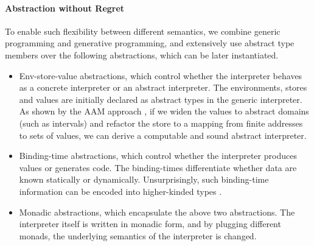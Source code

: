\iffalse
embedded domain-specific languages \cite{DBLP:conf/snapl/RompfBLSJAOSKDK15,
DBLP:journals/jfp/CaretteKS09, DBLP:conf/icfp/GibbonsW14,
Hofer:2008:PED:1449913.1449935},
The key idea that enables this flexibility is to use abstract type members first
abstract over concrete/abstract components (e.g., concrete values or abstract
values), then as well as the binding-time of them (e.g., static or dynamic). By
staging, the overhead caused by the monadic layers is eliminated in the
generated code.
\fi

\paragraph{Abstraction without Regret}

To enable such flexibility between different semantics, we combine generic
programming and generative programming, and extensively use abstract type
members over the following abstractions, which can be later instantiated.

\begin{itemize}
\item Env-store-value abstractions, which control whether the interpreter
  behaves as a concrete interpreter or an abstract interpreter.
  The environments, stores and values are initially declared as abstract types in the generic interpreter.
  As shown by the AAM approach \cite{DBLP:journals/jfp/HornM12,
  DBLP:conf/icfp/HornM10}, if we widen the values to abstract domains (such as
  intervals) and refactor the store to a mapping from finite addresses to sets of
  values, we can derive a computable and sound abstract interpreter.
\item Binding-time abstractions, which control whether the interpreter produces
  values or generates code. The binding-times differentiate whether data are 
  known statically or dynamically. Unsurprisingly, such binding-time
  information can be encoded into higher-kinded types 
    \cite{DBLP:journals/jfp/CaretteKS09, Ofenbeck:2017:SGP:3136040.3136060}.
\item Monadic abstractions, which encapsulate the above two abstractions.
  The interpreter itself is written in monadic form, and by plugging different monads, 
  the underlying semantics of the interpreter is changed.
\end{itemize}


